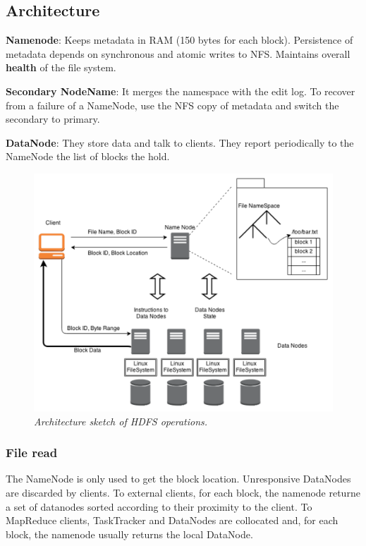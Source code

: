 	\subsection{Architecture}
		\par\indent
		\par\indent\textbf{Namenode}: Keeps metadata in RAM (150 bytes for each block). Persistence of metadata depends on synchronous and atomic writes to NFS. Maintains overall \textbf{health} of the file system.
		\par
		\textbf{Secondary NodeName}: It merges the namespace with the edit log. To recover from a failure of a NameNode, use the NFS copy of metadata and switch the secondary to primary.
		\par
		\textbf{DataNode}: They store data and talk to clients. They report periodically to the NameNode the list of blocks the hold.
		\begin{figure}[h!]
			\centering
			\includegraphics[width=0.8\linewidth]{images/arch_sketch.png}
			\caption{\textit{Architecture sketch of HDFS operations.}}
		\end{figure}
	\subsubsection{File read}
		\par
		The NameNode is only used to get the block location. Unresponsive DataNodes are discarded by clients.
		\newline
		To external clients, for each block, the namenode returne a set of datanodes sorted according to their proximity to the client.
		\newline
		To MapReduce clients, TaskTracker and DataNodes are collocated and, for each block, the namenode usually returns the local DataNode.
